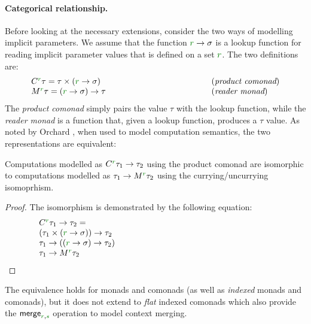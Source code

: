 \paragraph{Categorical relationship.}
Before looking at the necessary extensions, consider the two ways of modelling implicit 
parameters. We assume that the function $\cclrd{r} \rightarrow \sigma$ is a lookup function
for reading implicit parameter values that is defined on a set $\cclrd{r}$. The two definitions
are:
%
\begin{equation*}
\begin{array}{lll}
 \ctyp{\cclrd{r}}\tau = \tau \times (\cclrd{r} \rightarrow \sigma) &~\hspace{10em}~& (\emph{product comonad}) \\
 \mtyp{\cclrd{r}}\tau = (\cclrd{r} \rightarrow \sigma) \rightarrow \tau && (\emph{reader monad})
\end{array} 
\end{equation*}
%
The \emph{product comonad} simply pairs the value $\tau$ with the lookup function, while
the \emph{reader monad} is a function that, given a lookup function, produces a $\tau$ value.
As noted by Orchard \cite{comonads-vs-monads}, when used to model computation semantics, the 
two representations are equivalent:
%
\begin{remark}
Computations modelled as $\ctyp{\cclrd{r}}{\tau_1}\rightarrow\tau_2$ using the product comonad
are isomorphic to computations modelled as $\tau_1\rightarrow\mtyp{\cclrd{r}}{\tau_2}$ using
the currying/uncurrying isomoprhism.
\end{remark}
\begin{proof}
The isomorphism is demonstrated by the following equation:
\begin{equation*}
\begin{array}{l}
 \ctyp{\cclrd{r}}{\tau_1} \rightarrow \tau_2 = \\
 (\tau_1 \times (\cclrd{r} \rightarrow \sigma)) \rightarrow \tau_2 \\
 \tau_1 \rightarrow ((\cclrd{r} \rightarrow \sigma) \rightarrow \tau_2) \\
 \tau_1 \rightarrow \mtyp{\cclrd{r}}{\tau_2} \hspace{23em}\qedhere \\
\end{array}
\end{equation*}
\end{proof}

\noindent
The equivalence holds for monads and comonads (as well as \emph{indexed} monads
and comonads), but it does not extend to \emph{flat} indexed comonads which also provide
the $\ident{merge}_{\cclrd{r}, \cclrd{s}}$ operation to model context merging.


